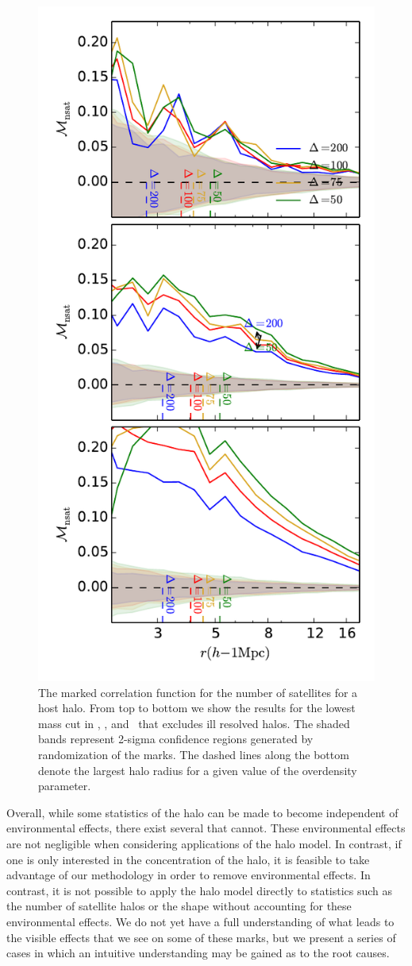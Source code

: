 \documentclass[usenatbib,usegraphicx,letterpaper]{mn2e}
\begin{document}
\begin{figure}
	\centering
	\includegraphics[width=.4\textwidth]{all_mcf_nsat_z00_cutcomp.pdf}
	\caption{The marked correlation function for the number of satellites for a host halo. From top to bottom we show the results for the lowest mass cut in \simA, \simB, and \simC \ that excludes ill resolved halos. The shaded bands represent 2-sigma confidence regions generated by randomization of the marks. The dashed lines along the bottom denote the largest halo radius for a given value of the overdensity parameter.}
	\label{fig:cc_mcf_nsat}
\end{figure}

Overall, while some statistics of the halo can be made to become independent of environmental effects, there exist several that cannot. These environmental effects are not negligible when considering applications of the halo model. In contrast, if one is only interested in the concentration of the halo, it is feasible to take advantage of our methodology in order to remove environmental effects. In contrast, it is not possible to apply the halo model directly to statistics such as the number of satellite halos or the shape without accounting for these environmental effects. We do not yet have a full understanding of what leads to the visible effects that we see on some of these marks, but we present a series of cases in which an intuitive understanding may be gained as to the root causes.
\end{document}

